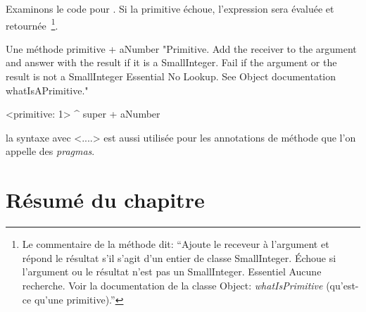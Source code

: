\documentclass[a4paper,10pt,twoside]{book}
\begin{document}
Examinons le code pour .
Si la primitive échoue, l'expression  sera
évaluée et retournée~\footnote{Le commentaire de la
  méthode dit: ``Ajoute le receveur à l'argument et répond le
  résultat s'il s'agit d'un entier de classe SmallInteger. Échoue
  si l'argument ou le résultat n'est pas un
  SmallInteger. Essentiel Aucune recherche. Voir la documentation de
  la classe Object: \emph{whatIsPrimitive} (qu'est-ce qu'une primitive).''}.

\begin{method}[primitive]{Une méthode primitive}
+ aNumber 
  "Primitive. Add the receiver to the argument and answer with the result
  if it is a SmallInteger. Fail if the argument or the result is not a
  SmallInteger  Essential  No Lookup. See Object documentation whatIsAPrimitive."

  <primitive: 1>
  ^ super + aNumber
\end{method}





 la syntaxe avec <....> est aussi utilisée
pour les annotations de méthode que l'on appelle des
\emph{pragmas}. %


\section{Résumé du chapitre}
\end{document}
